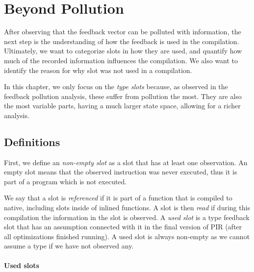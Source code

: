 \chapter{Beyond Pollution}


\begin{chapterabstract}
	\todoadd
\end{chapterabstract}

After observing that the feedback vector can be polluted with information, the next step is the understanding of how the feedback is used in the compilation. Ultimately, we want to categorize slots in how they are used, and quantify how much of the recorded information influences the compilation. We also want to identify the reason for why slot was not used in a compilation.

In this chapter, we only focus on the \textit{type slots} because, as observed in the feedback pollution analysis, these suffer from pollution the most. They are also the most variable parts, having a much larger state space, allowing for a richer analysis.

\section{Definitions}

First, we define an \textit{non-empty slot} as a slot that has at least one observation. An empty slot means that the observed instruction was never executed, thus it is part of a program which is not executed.

We say that a slot is \textit{referenced} if it is part of a function that is compiled to native, including slots inside of inlined functions. A slot is then \textit{read} if during this compilation the information in the slot is observed. A \textit{used slot} is a type feedback slot that has an assumption connected with it in the final version of PIR (after all optimizations finished running). A used slot is always non-empty as we cannot assume a type if we have not observed any.

\subsubsection*{Used slots}

